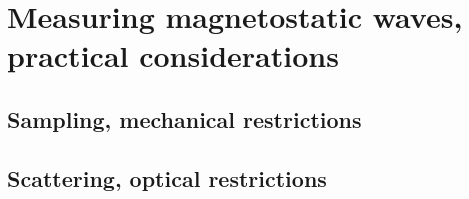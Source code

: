 \documentclass{article}
\begin{document}
\section{Measuring magnetostatic waves, practical considerations}

\subsection{Sampling, mechanical restrictions}

\subsection{Scattering, optical restrictions}

%
%
%
%
%
%
\end{document}
